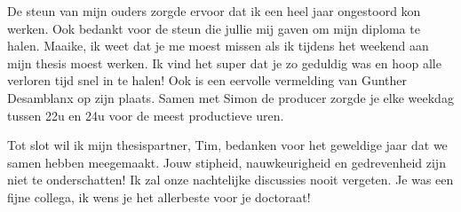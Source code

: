 \documentclass[master=cws,dutch,masteroption={vs,gs},inputenc=utf8]{kulemt}
\begin{document}
De steun van mijn ouders zorgde ervoor dat ik een heel jaar ongestoord kon werken.
Ook bedankt voor de steun die jullie mij gaven om mijn diploma te halen.
Maaike,  ik weet dat je me moest missen als ik tijdens het weekend aan mijn thesis moest werken.
Ik vind het super dat je zo geduldig was en hoop alle verloren tijd snel in te halen!
Ook is een eervolle vermelding van Gunther Desamblanx op zijn plaats.
Samen met Simon de producer zorgde je elke weekdag tussen 22u en 24u voor de meest productieve uren.

Tot slot wil ik mijn thesispartner, Tim,  bedanken voor het geweldige jaar dat we samen hebben meegemaakt.
Jouw stipheid, nauwkeurigheid en gedrevenheid zijn niet te onderschatten!
Ik zal onze nachtelijke discussies nooit vergeten.
Je was een fijne collega,  ik wens je het allerbeste voor je doctoraat!

\tableofcontents*
\end{document}
